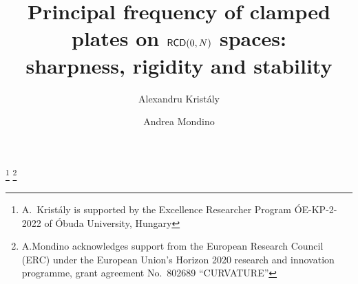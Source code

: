 \documentclass[11pt, reqno]{amsart}
\numberwithin{equation}{section}
\begin{document}
	
	\author{Alexandru Krist\'aly}
	\address{Institute of Applied Mathematics\\
		\'Obuda University\\
		1034 Budapest, Hungary \& Department of Economics\\
		Babe\c s-Bolyai University\\
		400591 Cluj-Napoca, Romania}
	
	\author{Andrea Mondino}
	\address{
		Mathematical Institute\\
		University of Oxford\\
		Oxford OX1 3LB\\
		England	}
	
	\renewcommand{\subjclassname}{%
		\textup{2020} Mathematics Subject Classification}
	\thanks{A.\ Krist\'aly is  supported by the
		Excellence Researcher Program \'OE-KP-2-2022 of \'Obuda University, Hungary}
	\thanks{A.\;Mondino acknowledges support from the European Research Council (ERC) under the European Union's Horizon 2020 research and innovation programme, grant agreement No.~802689 ``CURVATURE''
	}
	
	
	
	\title[Clamped plates on ${\sf RCD}(0,N)$ spaces]
	{Principal frequency of clamped plates on ${\sf RCD}(0,N)$ spaces:\\ sharpness, rigidity and stability
	}
	
	
	
	
	
\end{document}
